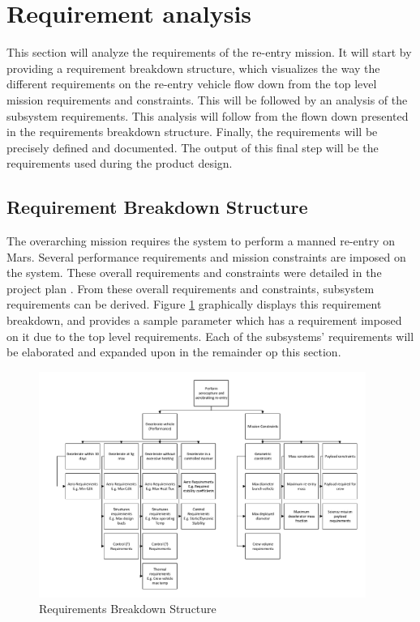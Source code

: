 \section{Requirement analysis} \label{ch:req}
This section will analyze the requirements of the re-entry mission. It will start by providing a requirement breakdown structure, which visualizes the way the different requirements on the re-entry vehicle flow down from the top level mission requirements and constraints. This will be followed by an analysis of the subsystem requirements. This analysis will follow from the flown down presented in the requirements breakdown structure. Finally, the requirements will be precisely defined and documented. The output of this final step will be the requirements used during the product design. %

\subsection{Requirement Breakdown Structure}
The overarching mission requires the system to perform a manned re-entry on Mars. Several performance requirements and mission constraints are imposed on the system. These overall requirements and constraints were detailed in the project plan \cite{Balasooriyan2015}. From these overall requirements and constraints, subsystem requirements can be derived. Figure \ref{fig:RBS} graphically displays this requirement breakdown, and provides a sample parameter which has a requirement imposed on it due to the top level requirements. Each of the subsystems' requirements will be elaborated and expanded upon in the remainder op this section. 

\begin{figure}[h]
\centering
\includegraphics[width=0.95\textwidth]{Figure/RBS.pdf}
\caption{Requirements Breakdown Structure} \label{fig:RBS}
\end{figure}










